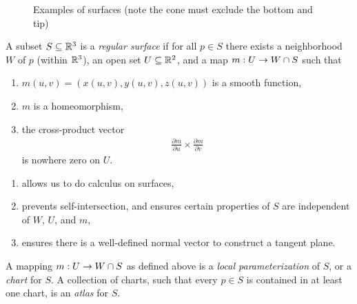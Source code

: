 \begin{figure}[h!]
    \centering
    \begin{minipage}[b]{0.3\linewidth}
    \end{minipage}
    \begin{minipage}[b]{0.3\linewidth}
    \end{minipage}
    \caption{Examples of surfaces (note the cone must exclude the bottom and tip)}
    \label{fig:diffgeom-surface-examples}
\end{figure}

\begin{defn}
    A subset $S \subseteq \mathbb{R}^3$ is a \emph{regular surface} if for all $p \in S$ there exists a neighborhood $W$ of $p$ (within $\mathbb{R}^3$), an open set $U \subseteq \mathbb{R}^2$, and a map $m: U \to W \cap S$ such that
    \begin{enumerate}[label=(\roman*)]
        \item $m(u, v) = (x(u, v), y(u, v), z(u, v))$ is a smooth function,
        \item $m$ is a homeomorphism,
        \item the cross-product vector
        \begin{align*}
            \frac{\partial m}{\partial u} \times \frac{\partial m}{\partial v}
        \end{align*}
        is nowhere zero on $U$.
    \end{enumerate}
\end{defn}

\begin{rmk}
    \begin{enumerate}[label=(\roman*)]
        \item allows us to do calculus on surfaces,
        \item prevents self-intersection, and ensures certain properties of $S$ are independent of $W$, $U$, and $m$,
        \item ensures there is a well-defined normal vector to construct a tangent plane.
    \end{enumerate}
\end{rmk}

\begin{defn}
    A mapping $m: U \to W \cap S$ as defined above is a \emph{local parameterization} of $S$, or a \emph{chart} for $S$. A collection of charts, such that every $p \in S$ is contained in at least one chart, is an \emph{atlas} for $S$.
\end{defn}
